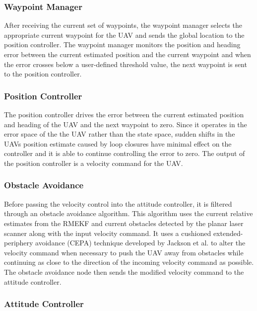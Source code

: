\documentclass[letterpaper, 10 pt, conference]{ieeeconf}  %
\begin{document}
\subsubsection{Waypoint Manager}

After receiving the current set of waypoints, the waypoint manager selects the appropriate current waypoint for the UAV and sends the global location to the position controller. The waypoint manager monitors the position and heading error between the current estimated position and the current waypoint and when the error crosses below a user-defined threshold value, the next waypoint is sent to the position controller.

\subsubsection{Position Controller}

The position controller drives the error between the current estimated position and heading of the UAV and the next waypoint to zero. Since it operates in the error space of the the UAV rather than the state space, sudden shifts in the UAVs position estimate caused by loop closures have minimal effect on the controller and it is able to continue controlling the error to zero. The output of the position controller is a velocity command for the UAV.

\subsubsection{Obstacle Avoidance} \label{obs_avoid}

Before passing the velocity control into the attitude controller, it is filtered through an obstacle avoidance algorithm. This algorithm uses the current relative estimates from the RMEKF and current obstacles detected by the planar laser scanner along with the input velocity command. It uses a cushioned extended-periphery avoidance (CEPA) technique developed by Jackson et al. \cite{Jackson2016} to alter the velocity command when necessary to push the UAV away from obstacles while continuing as close to the direction of the incoming velocity command as possible. The obstacle avoidance node then sends the modified velocity command to the attitude controller.

\subsubsection{Attitude Controller}
\end{document}

